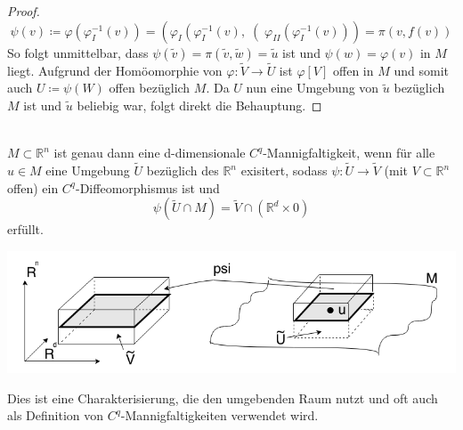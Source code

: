 \begin{proof}
\begin{equation*}
\psi (v) \coloneqq \varphi \left(\varphi_I ^{-1} (v) \right) =
\left( \varphi_I \left(\varphi_I ^{-1} (v),\right( 
\varphi_{II} \left(\varphi_I ^ {-1} (v) \right) \right) = \pi \left(v, f(v)\right)
\end{equation*}
\linebreak
So folgt unmittelbar, dass $\psi (\tilde{v}) = \pi (\tilde{v}, \tilde{w}) = \tilde{u}$ ist und $\psi (w) = \varphi (v)$ in $M$ liegt. Aufgrund der Homöomorphie von $\varphi : \tilde{V} \rightarrow \tilde{U} $ ist $\varphi[V]$ offen in $M$ und somit auch $U\coloneqq\psi(W)$ offen bezüglich $M$. Da $U$ nun eine Umgebung von $\tilde{u}$ bezüglich $M$ ist und $\tilde{u}$ beliebig war, folgt direkt die Behauptung.
\end{proof}

\begin{satz}
\mbox{} \\
$M \subset \mathbb{R}^{n}$ ist genau dann eine d-dimensionale $C^{q}$-Mannigfaltigkeit, wenn für alle $u\in M$ eine Umgebung $\tilde{U}$ bezüglich des $\mathbb{R}^n$ exisitert, sodass $\psi:\tilde{U}\rightarrow\tilde{V}$ (mit $V\subset\mathbb{R}^n$ offen) ein $C^q$-Diffeomorphismus ist und
    \begin{equation*}
    \psi \left( \tilde{U} \cap M \right) =
    \tilde{V} \cap \left( \mathbb{R}^d \times {0} \right) 
    \end{equation*}
erfüllt.
\begin{center}
\includegraphics[scale=0.5]{pictures/002-02}\\
\end{center}
\end{satz}

Dies ist eine Charakterisierung, die den umgebenden Raum nutzt und oft auch als Definition von $C^q$-Mannigfaltigkeiten verwendet wird.
    
